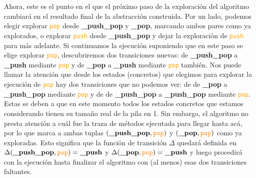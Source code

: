 Ahora, este es el punto en el que el próximo paso de la exploración del algoritmo cambiará en el resultado final de la abstracción construida.
Por un lado, podemos elegir explorar \textcolor{orange}{\texttt{pop}} desde \textbf{\_push\_pop} y \textbf{\_pop}, marcando ambos pares como ya explorados, o explorar \textcolor{orange}{\texttt{push}} desde \textbf{\_push\_pop} y dejar la exploración de \textcolor{orange}{\texttt{push}} para más adelante.
Si continuamos la ejecución suponiendo que en este paso se elige explorar \textcolor{orange}{\texttt{pop}}, descubriremos dos transiciones nuevas: de \textbf{\_push\_pop} a \textbf{\_push} mediante \textcolor{orange}{\texttt{pop}} y de \textbf{\_pop} a \textbf{\_push} mediante \textcolor{orange}{\texttt{pop}} también.
Nos puede llamar la atención que desde los estados (concretos) que elegimos para explorar la ejecución de \textcolor{orange}{\texttt{pop}} hay dos transiciones que no podemos ver: de de \textbf{\_pop} a \textbf{\_push\_pop} mediante \textcolor{orange}{\texttt{pop}} y de de \textbf{\_push\_pop} a \textbf{\_push\_pop} mediante \textcolor{orange}{\texttt{pop}}.
Estas se deben a que en este momento todos los estados concretos que estamos considerando tienen su tamaño real de la pila en 1.
Sin embargo, el algoritmo no presta atención a cuál fue la traza de métodos ejecutada para llegar hasta acá, por lo que marca a ambas tuplas $(\textbf{\_push\_pop},\textcolor{orange}{\texttt{pop}})$ y $(\textbf{\_pop},\textcolor{orange}{\texttt{pop}})$ como ya exploradas.
Esto significa que la función de transición $\Delta$ quedará definida en $\Delta(\textbf{\_push\_pop},\textcolor{orange}{\texttt{pop}}) = \textbf{\_push}$ y $\Delta(\textbf{\_pop},\textcolor{orange}{\texttt{pop}}) = \textbf{\_push}$ y luego procedirá con la ejecución hasta finalizar el algoritmo con (al menos) esas dos transiciones faltantes.

